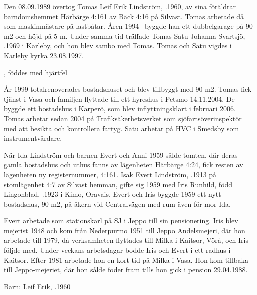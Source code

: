 Den 08.09.1989 övertog Tomas Leif Erik Lindström, .1960, av sina föräldrar barndomshemmet Härbärge 4:161 av Bäck 4:16 på Silvast. Tomas arbetade då som maskinmästare på lastbåtar. Åren 1994-- byggde han ett dubbelgarage på 90 m2 och höjd på 5 m. Under samma tid träffade Tomas Satu Johanna Svartsjö, .1969 i Karleby, och 	hon blev sambo med Tomas. Tomas och Satu vigdes i Karleby kyrka 23.08.1997.
\begin{jhchildren}
  \item {}, föddes med hjärtfel
  \item {}
  \item {}
  \item {}
\end{jhchildren}
År 1999 totalrenoverades bostadshuset och blev tillbyggt med 90 m2.	Tomas fick tjänst i Vasa och familjen flyttade till ett hyreshus i Petsmo 14.11.2004. De byggde ett bostadshus i Karperö, som blev inflyttningsklart i februari 2006. Tomas arbetar sedan 2004 på Trafiksäkerhetsverket som sjöfartsöverinspektör med att besikta och kontrollera fartyg. Satu arbetar på HVC i Smedsby som instrumentvårdare.


När Ida Lindström och barnen Evert och Anni 1959 sålde tomten, där deras gamla bostadshus och uthus fanns av lägenheten Härbärge 4:24, fick resten av lägenheten ny registernummer, 4:161. Isak Evert Lindström, .1913 på stomlägenhet 4:7 av Silvast hemman, gifte sig 1959 med Iris Runhild, född Lingonblad, .1923 i Kimo, 	Oravais. Evert och Iris byggde 1959 ett nytt bostadshus, 90 m2, på åkern vid Centralvägen med rum även för mor Ida.

Evert arbetade som 	stationskarl på SJ i Jeppo till sin pensionering. Iris blev mejerist 1948 och kom från Nederpurmo 1951 till Jeppo Andelsmejeri, där hon arbetade till 1979, då verksamheten flyttades till Milka i Kaitsor, Vörå, och Iris följde med. Under veckans arbetsdagar bodde Iris och Evert i ett radhus i Kaitsor. Efter 1981 arbetade hon en kort tid på Milka i Vasa. Hon kom tillbaka till Jeppo-mejeriet, där hon sålde foder fram tills hon gick i pension 29.04.1988.

Barn: 	 Leif Erik,	.1960

